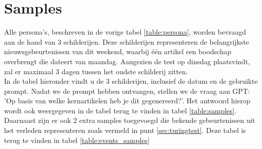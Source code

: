 \section{Samples}
Alle persona's, beschreven in de vorige tabel \ref{table:persona}, worden bevraagd aan de hand van 3 schilderijen. Deze schilderijen representeren de belangrijkste nieuwsgebeurtenissen van dit weekend, waarbij één artikel een boodschap overbrengt die dateert van maandag. Aangezien de test op dinsdag plaatsvindt, zal er maximaal 3 dagen tussen het oudste schilderij zitten. \\

In de tabel hieronder vindt u de 3 schilderijen, inclusief de datum en de gebruikte prompt. Nadat we de prompt hebben ontvangen, stellen we de vraag aan GPT: 'Op basis van welke kernartikelen heb je dit gegenereerd?'. Het antwoord hierop wordt ook weergegeven in de tabel terug te vinden in tabel \ref{table:samples}. \\

Daarnaast zijn er ook 2 extra samples toegevoegd die bekende gebeurtenissen uit het verleden representeren zoals vermeld in punt \ref{sec:turingtest}. Deze tabel is terug te vinden in tabel \ref{table:events_samples}

